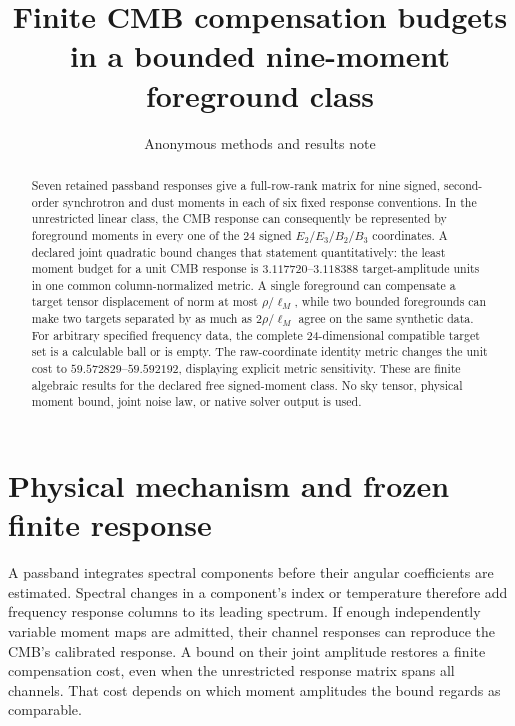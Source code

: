 \documentclass[aps,prd,onecolumn,11pt,nofootinbib,notitlepage]{revtex4-2}
\begin{document}
\title{Finite CMB compensation budgets in a bounded nine-moment foreground class}
\author{Anonymous methods and results note}
\noaffiliation
\begin{abstract}
Seven retained passband responses give a full-row-rank matrix for nine signed, second-order synchrotron and dust moments in each of six fixed response conventions. In the unrestricted linear class, the CMB response can consequently be represented by foreground moments in every one of the 24 signed $E_2/E_3/B_2/B_3$ coordinates. A declared joint quadratic bound changes that statement quantitatively: the least moment budget for a unit CMB response is $3.117720$--$3.118388$ target-amplitude units in one common column-normalized metric. A single foreground can compensate a target tensor displacement of norm at most $\rho/\ell_M$, while two bounded foregrounds can make two targets separated by as much as $2\rho/\ell_M$ agree on the same synthetic data. For arbitrary specified frequency data, the complete 24-dimensional compatible target set is a calculable ball or is empty. The raw-coordinate identity metric changes the unit cost to $59.572829$--$59.592192$, displaying explicit metric sensitivity. These are finite algebraic results for the declared free signed-moment class. No sky tensor, physical moment bound, joint noise law, or native solver output is used.
\end{abstract}
\maketitle

\section{Physical mechanism and frozen finite response}

A passband integrates spectral components before their angular coefficients are estimated. Spectral changes in a component's index or temperature therefore add frequency response columns to its leading spectrum. If enough independently variable moment maps are admitted, their channel responses can reproduce the CMB's calibrated response. A bound on their joint amplitude restores a finite compensation cost, even when the unrestricted response matrix spans all channels. That cost depends on which moment amplitudes the bound regards as comparable.
\end{document}
